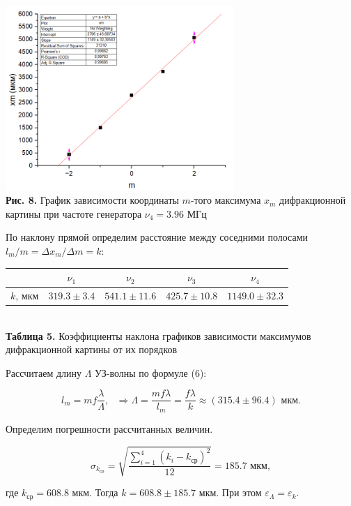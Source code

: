 \documentclass[a4paper,12pt]{article} %
\begin{document}
\begin{center}
\includegraphics[width=0.65\textwidth]{4.3.2_8.png}\\
\textbf{Рис. 8.} График зависимости координаты $m$-того максимума $x_{m}$ дифракционной картины при частоте генератора $\nu_{4} = 3.96$ МГц \\
\end{center}

\hfill \break По наклону прямой определим расстояние между соседними полосами $l_{m}/m = \Delta x_{m} / \Delta m = k$:

\begin{center}
\begin{tabular}{|c|c|c|c|c|}\hline
$ \text{ } $ & $ \nu_1 $ & $ \nu_2 $ & $ \nu_3 $ & $ \nu_4 $ \\\hline
$ k $, мкм & $ 319.3 \pm 3.4 $ & $ 541.1 \pm 11.6 $ & $ 425.7 \pm 10.8 $ & $ 1149.0 \pm 32.3 $ \\\hline
\end{tabular} \\
\hfill \break \textbf {Таблица 5.} Коэффициенты наклона графиков зависимости максимумов дифракционной картины от их порядков \\
\end{center}

\hfill \break Рассчитаем длину $\Lambda$ УЗ-волны по формуле (6):

$$
l_{m} = mf \frac {\lambda} {\Lambda}, \text{ } \Rightarrow \Lambda = \frac {mf\lambda} {l_{m}} = \frac {f \lambda} {k} \approx (315.4 \pm 96.4) \text{ мкм}.
$$

\hfill \break Определим погрешности рассчитанных величин. 

$$
\sigma_{k_{\text{ср}}} = \sqrt{ \frac {\sum_{i = 1}^{4} (k_{i} - k_{\text{ср}})^2} {12} } = 185.7 \text{ мкм},
$$

\hfill \break где $k_{\text{ср}} = 608.8$ мкм. Тогда $k = 608.8 \pm 185.7$ мкм. При этом $\varepsilon_{\Lambda} = \varepsilon_{k}$.
\end{document}
